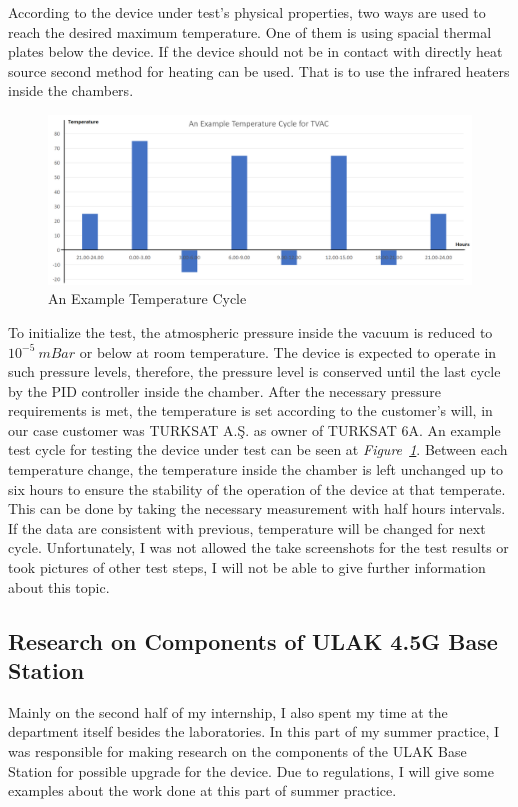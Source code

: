 	According to the device under test's physical properties, two ways are used to reach the desired maximum temperature. One of them is using spacial thermal plates below the device. If the device should not be in contact with directly heat source second method for heating can be used.  That is to use the infrared heaters inside the chambers.
	
\begin{figure}[H]
	\center
	\setlength{\unitlength}{\textwidth} 
	\includegraphics[width=1.0\unitlength]{tvac-cycle}
	\caption{\label{fig:tvac-cycle}An Example Temperature Cycle }
\end{figure}


	 To initialize the test, the atmospheric pressure inside the vacuum is reduced to $10^{-5}~mBar$ or below at room temperature. The device is expected to operate in such pressure levels, therefore, the pressure level is conserved until the last cycle by the PID controller inside the chamber. After the necessary pressure requirements is met, the temperature is set according to the customer's will, in our case customer was TURKSAT A.Ş. as owner of TURKSAT 6A. An example test cycle for testing the device under test can be seen at \textit{Figure~\ref{fig:tvac-cycle}}. Between each temperature change, the temperature inside the chamber is left unchanged up to six hours to ensure the stability of the operation of the device at that temperate. This can be done by taking the necessary measurement with half hours intervals. If the data are consistent with previous, temperature will be changed for next cycle. Unfortunately, I was not allowed the take screenshots for the test results or took pictures of other test steps,  I will not be able to give further information about this topic.
		

\subsection{Research on Components of ULAK 4.5G Base Station  }
\- \indent
	Mainly on the second half of my internship, I also spent my time at the department itself besides the laboratories. In this part of my summer practice, I was responsible for making research on the components of the ULAK Base Station for possible upgrade for the device. Due to regulations, I will give some examples about the work done at this part of summer practice. 


